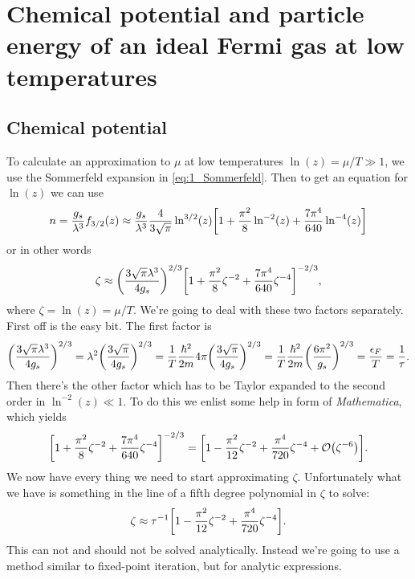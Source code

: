 \documentclass[11pt,letter, swedish, english
]{article}
\renewcommand{\thesubsection}{\arabic{section} (\alph{subsection})}
\begin{document}
\section{Chemical potential and particle energy of an ideal
  Fermi gas at low temperatures}
\renewcommand{\thesubsection}{\arabic{section} (\roman{subsection})}
\subsection{Chemical potential}
To calculate an approximation to $\mu$ at low temperatures
$\ln(z)=\mu/T\gg1$, we use the Sommerfeld expansion in
\eqref{eq:1_Sommerfeld}. 
Then to get an equation for $\ln(z)$ we can use
\begin{equation}
n=\frac{g_s}{\lambda^3}f_{3/2}(z)
\approx\frac{g_s}{\lambda^3}
\frac{4}{3\sqrt{\pi}}\ln^{3/2}(z)
\qty[1+\frac{\pi^2}{8}\ln^{-2}(z) 
+\frac{7\pi^4}{640}\ln^{-4}(z) ]
\end{equation}
or in other words
\begin{equation}
\zeta\approx\qty(\frac{3\sqrt{\pi}\lambda^3}{4g_s})^{2/3}
\qty[1+\frac{\pi^2}{8}\zeta^{-2}
+\frac{7\pi^4}{640}\zeta^{-4} ]^{-2/3},
\end{equation}
where $\zeta=\ln(z)=\mu/T$.
We're going to deal with these two factors separately.
First off is the easy bit. The first factor is
\begin{equation}
\qty(\frac{3\sqrt{\pi}\lambda^3}{4g_s})^{2/3}
=\lambda^2\qty(\frac{3\sqrt{\pi}}{4g_s})^{2/3}
=\frac{1}{T}\frac{\hbar^2}{2m}4\pi\qty(\frac{3\sqrt{\pi}}{4g_s})^{2/3}
=\frac{1}{T}\frac{\hbar^2}{2m}\qty(\frac{6\pi^2}{g_s})^{2/3}
=\frac{\epsilon_F}{T}=\frac{1}{\tau}.
\end{equation}
Then there's the other factor which has to be Taylor expanded to the
second order in $\ln^{-2}(z)\ll1$. To do this we enlist some help in
form of \emph{Mathematica}\footnotemark{}, which yields
\begin{equation}
\qty[1 + \frac{\pi^2}{8}\zeta^{-2}
 + \frac{7\pi^4}{640}\zeta^{-4}]^{-2/3} 
=\qty[1 - \frac{\pi^2}{12}\zeta^{-2}
 + \frac{\pi^4}{720}\zeta^{-4} + \order{\zeta^{-6}}].
\end{equation}
We now have every thing we need to start approximating $\zeta$.
Unfortunately what we have is something in the line of a fifth degree
polynomial in $\zeta$ to solve: 
\begin{equation}\label{eq:2_fixed-point}
\zeta\approx \tau^{-1}\qty[1 - \frac{\pi^2}{12}\zeta^{-2}
 + \frac{\pi^4}{720}\zeta^{-4}].
\end{equation}
This can not and should not be solved
analytically. Instead we're going to use a method similar to
fixed-point iteration, but for analytic expressions.
\end{document}
